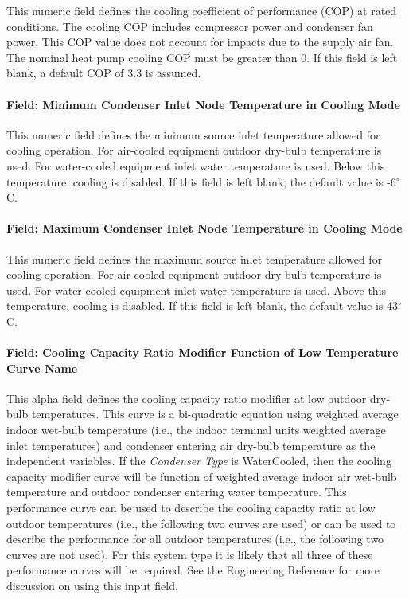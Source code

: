 This numeric field defines the cooling coefficient of performance (COP) at rated conditions. The cooling COP includes compressor power and condenser fan power. This COP value does not account for impacts due to the supply air fan. The nominal heat pump cooling COP must be greater than 0. If this field is left blank, a default COP of 3.3 is assumed.

\paragraph{Field: Minimum Condenser Inlet Node Temperature in Cooling Mode}\label{field-minimum-condenser-inlet-node-temperature-in-cooling-mode-000}

This numeric field defines the minimum source inlet temperature allowed for cooling operation. For air-cooled equipment outdoor dry-bulb temperature is used. For water-cooled equipment inlet water temperature is used. Below this temperature, cooling is disabled. If this field is left blank, the default value is -6$^\circ$C.

\paragraph{Field: Maximum Condenser Inlet Node Temperature in Cooling Mode}\label{field-maximum-condenser-inlet-node-temperature-in-cooling-mode-000}

This numeric field defines the maximum source inlet temperature allowed for cooling operation. For air-cooled equipment outdoor dry-bulb temperature is used. For water-cooled equipment inlet water temperature is used. Above this temperature, cooling is disabled. If this field is left blank, the default value is 43$^\circ$C.

\paragraph{Field: Cooling Capacity Ratio Modifier Function of Low Temperature Curve Name}\label{field-cooling-capacity-ratio-modifier-function-of-low-temperature-curve-name}

This alpha field defines the cooling capacity ratio modifier at low outdoor dry-bulb temperatures. This curve is a bi-quadratic equation using weighted average indoor wet-bulb temperature (i.e., the indoor terminal units weighted average inlet temperatures) and condenser entering air dry-bulb temperature as the independent variables. If the \textit{Condenser Type} is WaterCooled, then the cooling capacity modifier curve will be function of weighted average indoor air wet-bulb temperature and outdoor condenser entering water temperature. This performance curve can be used to describe the cooling capacity ratio at low outdoor temperatures (i.e., the following two curves are used) or can be used to describe the performance for all outdoor temperatures (i.e., the following two curves are not used). For this system type it is likely that all three of these performance curves will be required. See the Engineering Reference for more discussion on using this input field.

